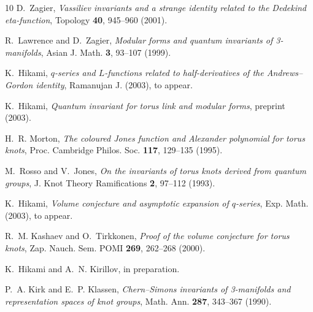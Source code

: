 \documentclass[12pt,reqno]{amsart}
\begin{document}
\begin{thebibliography}{10}
D.~Zagier, \emph{Vassiliev invariants and a strange identity related to the
  {Dedekind} eta-function}, Topology \textbf{40}, 945--960 (2001).

R.~Lawrence and D.~Zagier, \emph{Modular forms and quantum invariants of
  3-manifolds}, Asian J. Math. \textbf{3}, 93--107 (1999).

K.~Hikami, \emph{$q$-series and {$L$}-functions related to half-derivatives of
  the {Andrews--Gordon} identity}, Ramanujan J.  (2003), to appear.

K.~Hikami, \emph{Quantum invariant for torus link and modular forms}, preprint
  (2003).

H.~R. Morton, \emph{The coloured {Jones} function and {Alexander} polynomial for
  torus knots}, Proc. Cambridge Philos. Soc. \textbf{117}, 129--135 (1995).

M.~Rosso and V.~Jones, \emph{On the invariants of torus knots derived from
  quantum groups}, J. Knot Theory Ramifications \textbf{2}, 97--112 (1993).

K.~Hikami, \emph{Volume conjecture and asymptotic expansion of $q$-series}, Exp.
  Math.  (2003), to appear.

R.~M. Kashaev and O.~Tirkkonen, \emph{Proof of the volume conjecture for torus
  knots}, Zap. Nauch. Sem. POMI \textbf{269}, 262--268 (2000).

K.~Hikami and A.~N. Kirillov,
in preparation.

P.~A. Kirk and E.~P. Klassen, \emph{{Chern--Simons} invariants of 3-manifolds
  and representation spaces of knot groups}, Math. Ann. \textbf{287}, 343--367
  (1990).

\end{thebibliography}

\end{document}
